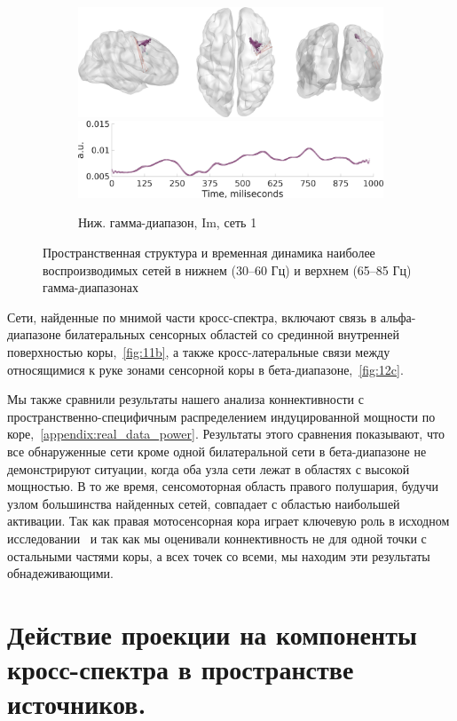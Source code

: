 \begin{figure}
 \begin{subfigure}[b]{0.4\textwidth}
 \includegraphics[width=\textwidth]{../images/psiicos_paper/Figure13_c1.jpg}
 \includegraphics[width=\textwidth]{../images/psiicos_paper/Figure13_c2.jpg}
 \caption{Ниж. гамма-диапазон, Im, сеть 1}\label{fig:13c}
 \end{subfigure}
 \caption{Пространственная структура и временная динамика наиболее воспроизводимых сетей в нижнем (30--60 Гц) и верхнем (65--85 Гц) гамма-диапазонах}\label{fig:13}
\end{figure} %

Сети, найденные по мнимой части кросс-спектра, включают связь в альфа-диапазоне
билатеральных сенсорных областей со срединной внутренней поверхностью
коры,~\ref{fig:11b}, а также кросс-латеральные связи между относящимися к руке
зонами сенсорной коры в бета-диапазоне,~\ref{fig:12c}.

Мы также сравнили результаты нашего анализа коннективности с
пространственно-специфичным распределением индуцированной мощности по
коре,~\ref{appendix:real_data_power}. Результаты этого сравнения показывают,
что все обнаруженные сети кроме одной билатеральной сети в бета-диапазоне не
демонстрируют ситуации, когда оба узла сети лежат в областях с высокой
мощностью. В то же время, сенсомоторная область правого полушария, будучи узлом
большинства найденных сетей, совпадает с областью наибольшей активации. Так как
правая мотосенсорная кора играет ключевую роль в исходном
исследовании~\cite{DeLange2008} и так как мы оценивали коннективность не для
одной точки с остальными частями коры, а всех точек со всеми, мы находим эти
результаты обнадеживающими.

\section{Действие проекции на компоненты кросс-спектра в пространстве источников.}\label{sec:subspaces_attenuation}

